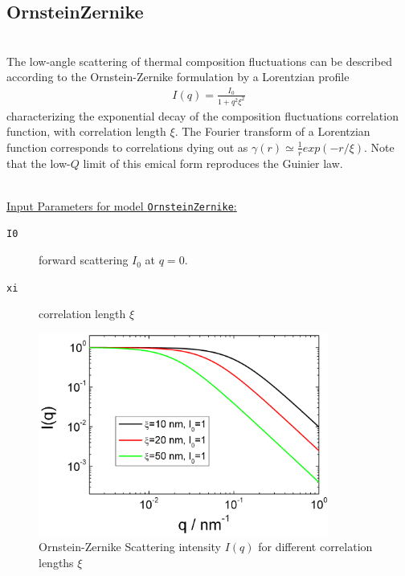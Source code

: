 \clearpage
\subsection{OrnsteinZernike}
\label{sect:Zernike}
 ~\\
The low-angle scattering of thermal composition fluctuations can be
described according to the Ornstein-Zernike formulation by a
Lorentzian profile
\begin{align}
I(q) = \frac{I_0}{1+q^2\xi^2}
\end{align}
characterizing the exponential decay of the composition fluctuations
correlation function, with correlation length $\xi$. The Fourier
transform of a Lorentzian function corresponds to correlations dying
out as $\gamma(r) \simeq \frac{1}{r}exp(-r/\xi)$. Note that the
low-$Q$ limit of this emical form reproduces the Guinier law.

\hspace{1pt}\\
\uline{Input Parameters for model \texttt{OrnsteinZernike}:}\\
\begin{description}
\item[\texttt{I0}] forward scattering $I_0$ at $q=0$.
\item[\texttt{xi}] correlation length $\xi$
\end{description}

\begin{figure}[htb]
\begin{center}
\includegraphics[width=0.85\textwidth]{OrnsteinZernicke.png}
\end{center}
\caption{Ornstein-Zernike Scattering intensity $I(q)$ for different
correlation lengths $\xi$} \label{fig:OrnsteinZernicke}
\end{figure}
\clearpage

